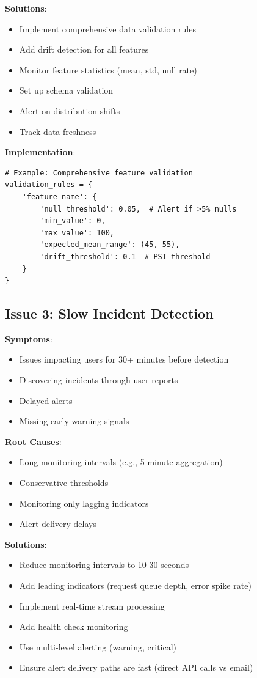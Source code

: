 \textbf{Solutions}:
\begin{itemize}
    \item Implement comprehensive data validation rules
    \item Add drift detection for all features
    \item Monitor feature statistics (mean, std, null rate)
    \item Set up schema validation
    \item Alert on distribution shifts
    \item Track data freshness
\end{itemize}

\textbf{Implementation}:
\begin{lstlisting}[style=python]
# Example: Comprehensive feature validation
validation_rules = {
    'feature_name': {
        'null_threshold': 0.05,  # Alert if >5% nulls
        'min_value': 0,
        'max_value': 100,
        'expected_mean_range': (45, 55),
        'drift_threshold': 0.1  # PSI threshold
    }
}
\end{lstlisting}

\subsection{Issue 3: Slow Incident Detection}

\textbf{Symptoms}:
\begin{itemize}
    \item Issues impacting users for 30+ minutes before detection
    \item Discovering incidents through user reports
    \item Delayed alerts
    \item Missing early warning signals
\end{itemize}

\textbf{Root Causes}:
\begin{itemize}
    \item Long monitoring intervals (e.g., 5-minute aggregation)
    \item Conservative thresholds
    \item Monitoring only lagging indicators
    \item Alert delivery delays
\end{itemize}

\textbf{Solutions}:
\begin{itemize}
    \item Reduce monitoring intervals to 10-30 seconds
    \item Add leading indicators (request queue depth, error spike rate)
    \item Implement real-time stream processing
    \item Add health check monitoring
    \item Use multi-level alerting (warning, critical)
    \item Ensure alert delivery paths are fast (direct API calls vs email)
\end{itemize}

